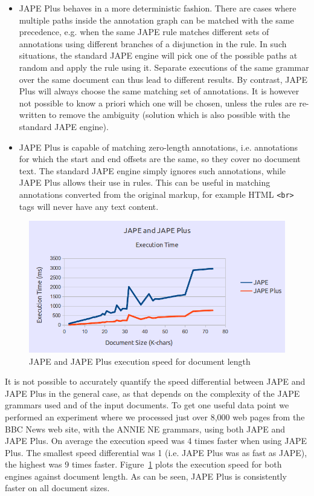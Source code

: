 \begin{itemize}
  \item JAPE Plus behaves in a more deterministic fashion. There are cases where
  multiple paths inside the annotation graph can be matched with the same
  precedence, e.g. when the same JAPE rule matches different sets of annotations
  using different branches of a disjunction in the rule. In such situations, the
  standard JAPE engine will pick one of the possible paths at random and apply
  the rule using it. Separate executions of the same grammar over the same
  document can thus lead to different results. By contrast, JAPE Plus will
  always choose the same matching set of annotations. It is however not possible
  to know a priori which one will be chosen, unless the rules are re-written to
  remove the ambiguity (solution which is also possible with the standard JAPE
  engine).
  \item JAPE Plus is capable of matching zero-length annotations, i.e. 
  annotations for which the start and end offsets are the same, so they cover 
  no document text. The standard JAPE engine simply ignores such annotations,
  while JAPE Plus allows their use in rules. This can be useful in matching
  annotations converted from the original markup, for example HTML \verb!<br>! 
  tags will never have any text content.
\end{itemize}  
 
\begin{figure}[htb]
\begin{center}
\includegraphics[scale=0.5]{jape-v-japeplus.png}
\caption{JAPE and JAPE Plus execution speed for document length}
\label{fig:jape:plus-speed}
\end{center}
\end{figure}

It is not possible to accurately quantify the speed differential between JAPE
and JAPE Plus in the general case, as that depends on the complexity of the JAPE
grammars used and of the input documents. To get one useful data point we
performed an experiment where we processed just over 8,000 web pages from the
BBC News web site, with the ANNIE NE grammars, using both JAPE and JAPE Plus. On
average the execution speed was 4 times faster when using JAPE Plus. The
smallest speed differential was 1 (i.e. JAPE Plus was as fast as JAPE), the
highest was 9 times faster. Figure~\ref{fig:jape:plus-speed} plots the execution
speed for both engines against document length. As can be seen, JAPE Plus is
consistently faster on all document sizes. 

